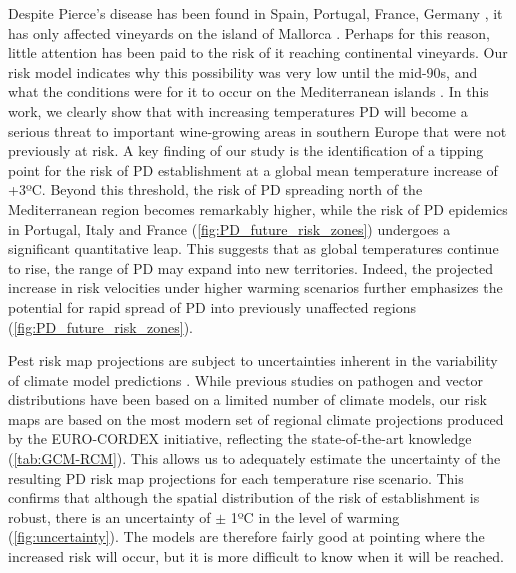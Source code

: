 Despite Pierce's disease has been found in Spain, Portugal, France, Germany
\cite{Bragard2019}, it has only affected vineyards on the island of Mallorca
\cite{moralejo2019insights}. Perhaps for this reason,
little attention has been paid to the risk of it reaching continental
vineyards. Our risk model indicates why this possibility was very low until the
mid-90s, and what the conditions were for it to occur on the Mediterranean
islands \cite{GimenezRomero2022_CommsBio}.  In this work,
we clearly show that  with increasing temperatures PD will become a serious
threat to important wine-growing areas in southern Europe that were not
previously at risk. A key finding of our study is the identification of a
tipping point for the risk of PD establishment at a global mean temperature
increase of +3ºC. Beyond this threshold, the risk of PD spreading north of the
Mediterranean region becomes remarkably higher, while the risk of PD epidemics
in Portugal, Italy and France (\cref{fig:PD_future_risk_zones}) undergoes a
significant quantitative leap. This suggests that as global temperatures
continue to rise, the range of PD may expand into new territories. Indeed, the
projected increase in risk velocities under higher warming scenarios further
emphasizes the potential for rapid spread of PD into previously unaffected
regions (\cref{fig:PD_future_risk_zones}).

Pest risk map projections are subject to uncertainties inherent in the
variability of climate model predictions \cite{venette2010pest}. While previous
studies on pathogen and vector distributions have been based on a limited
number of climate models, our risk maps are based on the most modern set of
regional climate projections produced by the EURO-CORDEX initiative, reflecting
the state-of-the-art knowledge (\cref{tab:GCM-RCM}). This allows us to
adequately estimate the uncertainty of the resulting PD risk map projections
for each temperature rise scenario. This confirms that although the spatial
distribution of the risk of establishment is robust, there is an uncertainty of
$\pm$ 1ºC in the level of warming (\cref{fig:uncertainty}). The models are
therefore fairly good at  pointing  where the increased risk will occur, but it
is more difficult to know when it will be reached.

